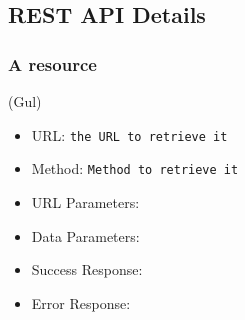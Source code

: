 \subsection{REST API Details}


\subsubsection*{A resource}


(Gul)


\begin{itemize}
    \item URL: \texttt{the URL to retrieve it}
    \item Method: \texttt{Method to retrieve it}
    \item URL Parameters:
    \item Data Parameters: 
    \item Success Response:
    \item Error Response:
    
\end{itemize}

